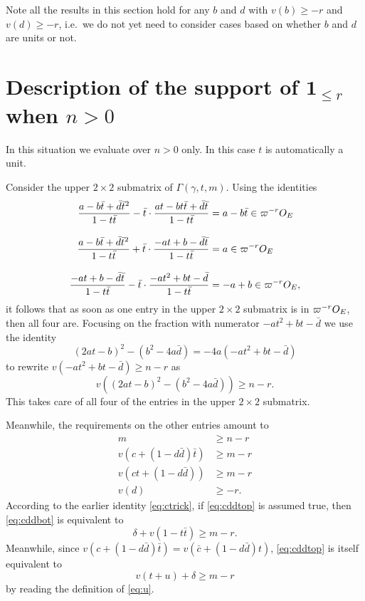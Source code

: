 Note all the results in this section hold for any $b$ and $d$
with $v(b) \ge -r$ and $v(d) \ge -r$, i.e.~we do not yet need to consider cases
based on whether $b$ and $d$ are units or not.

\section{Description of the support of $\mathbf{1}_{\le r}$ when $n > 0$}
In this situation we evaluate over $n > 0$ only.
In this case $t$ is automatically a unit.

Consider the upper $2 \times 2$ submatrix of $\Gamma(\gamma, t, m)$.
Using the identities
\begin{align*}
  \dfrac{a-b\bar t+\bar d \bar t^2}{1-t \bar t}
    - \bar t \cdot \dfrac{at-bt\bar t+\bar d \bar t}{1-t \bar t}
    &= a-b\bar t \in \varpi^{-r} O_E \\[2ex]
  \dfrac{a-b\bar t+\bar d \bar t^2}{1-t \bar t}
    + \bar t \cdot \dfrac{-at+b-\bar d \bar t}{1-t \bar t}
    &= a \in \varpi^{-r} O_E \\[2ex]
  \dfrac{-at+b-\bar d \bar t}{1-t \bar t}
    - \bar t \cdot \dfrac{-at^2+bt-\bar d}{1-t \bar t}
    &= -a+b \in \varpi^{-r} O_E,
\end{align*}
it follows that as soon as one entry in the upper $2 \times 2$
submatrix is in $\varpi^{-r} O_E$, then all four are.
Focusing on the fraction with numerator $-at^2+bt-\bar d$
we use the identity
\[ (2at-b)^2 - (b^2-4a\bar d) = -4a(-at^2+bt-\bar d) \]
to rewrite $v(-at^2+bt-\bar d) \geq n-r$ as
\[ v\left( (2at-b)^2 - (b^2-4a\bar d) \right) \geq n-r. \]
This takes care of all four of the entries in the upper $2 \times 2$ submatrix.

Meanwhile, the requirements on the other entries amount to
\begin{align}
  m & \geq n - r \\
  v\left( c+(1-d \bar d) \bar t \right) &\geq m-r \label{eq:cddtop} \\
  v\left( ct+(1-d \bar d) \right) &\geq m-r \label{eq:cddbot} \\
  v(d) &\ge -r \label{eq:vd_ge_minus_r}.
\end{align}
According to the earlier identity \eqref{eq:ctrick}, if \eqref{eq:cddtop} is assumed true,
then \eqref{eq:cddbot} is equivalent to
\[ \delta + v(1-t \bar t) \ge m-r. \]
Meanwhile, since $v(c+(1-d \bar d) \bar t) = v(\bar c + (1-d \bar d)t)$,
\eqref{eq:cddtop} is itself equivalent to
\[ v(t+u) + \delta \geq m-r \]
by reading the definition of \eqref{eq:u}.

